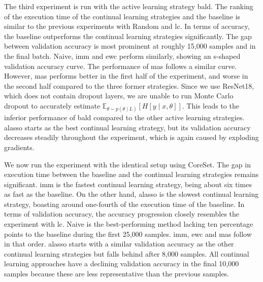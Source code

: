 The third experiment is run with the active learning strategy \gls{bald}. The ranking of the execution time of the continual learning strategies and the baseline is similar to
the previous experiments with Random and \gls{lc}. In terms of accuracy, the baseline outperforms the continual learning strategies significantly. The gap between
validation accuracy is most prominent at roughly 15,000 samples and in the final batch. Naive, \gls{imm} and \gls{ewc} perform similarly, showing an
s-shaped validation accuracy curve. The performance of \gls{mas} follows a similar curve. However, \gls{mas} performs better in the first half of the experiment,
and worse in the second half compared to the three former strategies. Since we use ResNet18, which does not contain dropout layers, we are unable to run Monte Carlo
dropout to accurately estimate $\mathbb{E}_{\theta \sim p(\theta \mid L)} [H[y \mid x, \theta]]$. This leads to the inferior performance of \gls{bald} compared to the
other active learning strategies. \gls{alasso} starts as the best continual learning strategy, but its validation accuracy decreases steadily throughout the
experiment, which is again caused by exploding gradients. \par 



We now run the experiment with the identical setup using CoreSet. The gap in execution time between the baseline and the continual learning 
strategies remains significant. \gls{imm} is the fastest continual learning strategy, being about six times as fast as the baseline. On the other hand, \gls{alasso}
is the slowest continual learning strategy, boasting around one-fourth of the execution time of the baseline. In terms of validation accuracy, the accuracy progression
closely resembles the experiment with \gls{lc}. Naive is the best-performing method lacking ten percentage points to the baseline during the first 25,000 samples. \gls{imm},
\gls{ewc} and \gls{mas} follow in that order. \gls{alasso} starts with a similar validation accuracy as the other continual learning strategies but falls behind after 8,000 samples.
All continual learning approaches have a declining validation accuracy in the final 10,000 samples because these are less representative
than the previous samples. \par




